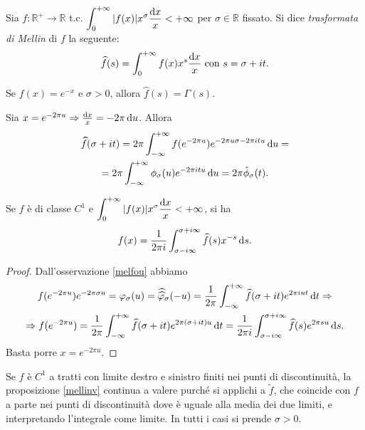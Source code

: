 \begin{defn}
  Sia $f:\mathbb{R}^+ \longrightarrow \mathbb{R}$ t.c. $\displaystyle \int_0^{+\infty} |f(x)|x^{\sigma}\frac{\mathop{}\!\mathrm{d} x}{x}<+\infty$ per $\sigma \in \mathbb{R}$ fissato. Si dice \textit{trasformata di Mellin} di $f$ la seguente:
  $$\wideparen{f}(s)=\int_0^{+\infty} f(x)x^s\frac{\diff x}{x}\text{ con }s=\sigma+it.$$
\end{defn}

\begin{ex}
  Se $f(x)=e^{-x}$ e $\sigma>0$, allora $\wideparen{f}(s)=\Gamma(s)$.
\end{ex}

\begin{oss} \label{melfou}
  Sia $x=e^{-2\pi u} \Rightarrow \frac{\mathop{}\!\mathrm{d} x}{x}=-2\pi\mathop{}\!\mathrm{d} u$. Allora
  \begin{gather*}
    \wideparen{f}(\sigma+it)=2\pi\int_{-\infty}^{+\infty} f(e^{-2\pi u})e^{-2\pi u\sigma-2\pi itu}\diff u= \\
    =2\pi \int_{-\infty}^{+\infty} \phi_{\sigma}(u)e^{-2\pi itu}\diff u=2\pi\hat{\phi}_{\sigma}(t).
  \end{gather*}
\end{oss}

\begin{prop} \label{mellinv}
  Se $f$ è di classe $C^1$ e $\displaystyle \int_0^{+\infty} |f(x)|x^{\sigma}\frac{\mathop{}\!\mathrm{d} x}{x}<+\infty$, si ha
  $$f(x)=\frac{1}{2\pi i} \int_{\sigma-i\infty}^{\sigma+i\infty} \wideparen{f}(s)x^{-s}\diff s.$$
\end{prop}

\begin{proof}
  Dall'osservazione \ref{melfou} abbiamo
  \begin{gather*}
    f(e^{-2\pi u})e^{-2\pi\sigma u}=\varphi_{\sigma}(u)=\widehat{\widehat{\varphi}}_{\sigma}(-u)=\frac{1}{2\pi}\int_{-\infty}^{+\infty} \wideparen{f}(\sigma+it)e^{2\pi iut}\diff t \implies \\
    \implies f(e^{-2\pi u})=\frac{1}{2\pi}\int_{-\infty}^{+\infty} \wideparen{f}(\sigma+it)e^{2\pi(\sigma+it)u}\diff t=\frac{1}{2\pi i}\int_{\sigma-i\infty}^{\sigma+i\infty} \wideparen{f}(s)e^{2\pi su}\diff s.
  \end{gather*}
  Basta porre $x=e^{-2\pi u}$.
\end{proof}

\begin{oss}
  Se $f$ è $C^1$ a tratti con limite destro e sinistro finiti nei punti di discontinuità, la proposizione \ref{mellinv} continua a valere purché si applichi a $\tilde{f}$, che coincide con $f$ a parte nei punti di discontinuità dove è uguale alla media dei due limiti, e interpretando l'integrale come limite. In tutti i casi si prende $\sigma>0$.
\end{oss}


